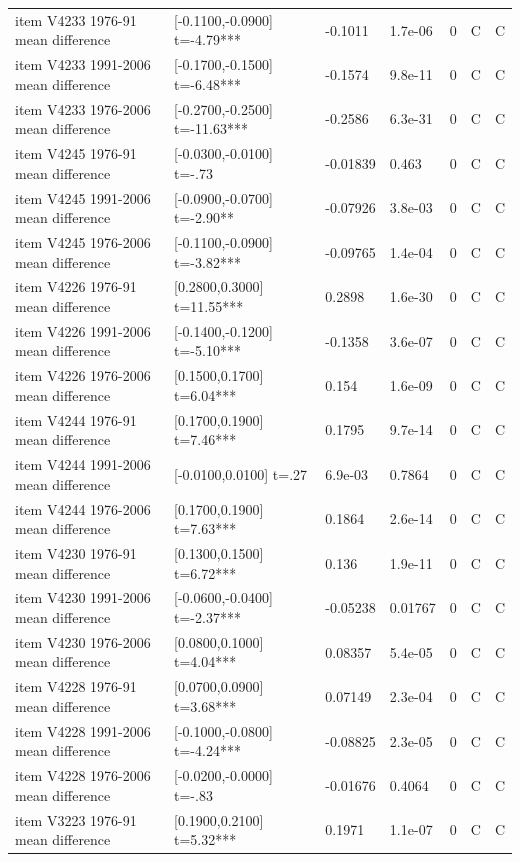 {\begin{longtable}{@{}p{.245\linewidth}p{.17\linewidth}p{.17\linewidth}p{.085\linewidth}p{.060\linewidth}p{.08\linewidth}p{.07\linewidth}@{}}
item V4233 1976-91 mean difference & [-0.1100,-0.0900] t=-4.79*** & -0.1011 & 1.7e-06 & 0 & C & C\\
item V4233 1991-2006 mean difference & [-0.1700,-0.1500] t=-6.48*** & -0.1574 & 9.8e-11 & 0 & C & C\\
item V4233 1976-2006 mean difference & [-0.2700,-0.2500] t=-11.63*** & -0.2586 & 6.3e-31 & 0 & C & C\\
item V4245 1976-91 mean difference & [-0.0300,-0.0100] t=-.73 & -0.01839 & 0.463 & 0 & C & C\\
item V4245 1991-2006 mean difference & [-0.0900,-0.0700] t=-2.90** & -0.07926 & 3.8e-03 & 0 & C & C\\
item V4245 1976-2006 mean difference & [-0.1100,-0.0900] t=-3.82*** & -0.09765 & 1.4e-04 & 0 & C & C\\
item V4226 1976-91 mean difference & [0.2800,0.3000] t=11.55*** & 0.2898 & 1.6e-30 & 0 & C & C\\
item V4226 1991-2006 mean difference & [-0.1400,-0.1200] t=-5.10*** & -0.1358 & 3.6e-07 & 0 & C & C\\
item V4226 1976-2006 mean difference & [0.1500,0.1700] t=6.04*** & 0.154 & 1.6e-09 & 0 & C & C\\
item V4244 1976-91 mean difference & [0.1700,0.1900] t=7.46*** & 0.1795 & 9.7e-14 & 0 & C & C\\
item V4244 1991-2006 mean difference & [-0.0100,0.0100] t=.27 & 6.9e-03 & 0.7864 & 0 & C & C\\
item V4244 1976-2006 mean difference & [0.1700,0.1900] t=7.63*** & 0.1864 & 2.6e-14 & 0 & C & C\\
item V4230 1976-91 mean difference & [0.1300,0.1500] t=6.72*** & 0.136 & 1.9e-11 & 0 & C & C\\
item V4230 1991-2006 mean difference & [-0.0600,-0.0400] t=-2.37*** & -0.05238 & 0.01767 & 0 & C & C\\
item V4230 1976-2006 mean difference & [0.0800,0.1000] t=4.04*** & 0.08357 & 5.4e-05 & 0 & C & C\\
item V4228 1976-91 mean difference & [0.0700,0.0900] t=3.68*** & 0.07149 & 2.3e-04 & 0 & C & C\\
item V4228 1991-2006 mean difference & [-0.1000,-0.0800] t=-4.24*** & -0.08825 & 2.3e-05 & 0 & C & C\\
item V4228 1976-2006 mean difference & [-0.0200,-0.0000] t=-.83 & -0.01676 & 0.4064 & 0 & C & C\\
item V3223 1976-91 mean difference & [0.1900,0.2100] t=5.32*** & 0.1971 & 1.1e-07 & 0 & C & C\\

\end{longtable}}
